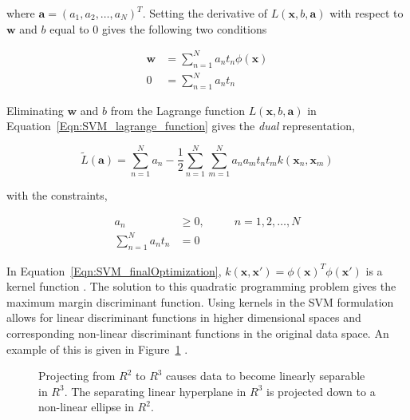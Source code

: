 where $\mathbf{a} = (a_1, a_2, \ldots, a_N)^T$.  Setting the derivative of $L(\mathbf{x}, b, \mathbf{a})$ with respect to $\mathbf{w}$ and $b$ equal to 0 gives the following two conditions

\begin{align}
\mathbf{w} &= \sum\limits_{n=1}^N a_n t_n \phi(\mathbf{x})\\
0 &=  \sum\limits_{n=1}^N a_n t_n
\end{align}

Eliminating $\mathbf{w}$ and $b$ from the Lagrange function $L(\mathbf{x}, b, \mathbf{a})$ in Equation~\ref{Eqn:SVM_lagrange_function} gives the \emph{dual} representation,

\begin{equation}
\tilde{L}(\mathbf{a}) = \sum\limits_{n=1}^N a_n - \frac{1}{2} \sum\limits_{n=1}^N \sum\limits_{m=1}^N a_n a_m t_n t_m k(\mathbf{x}_n, \mathbf{x}_m)
\label{Eqn:SVM_finalOptimization}
\end{equation}

with the constraints,

\begin{align}
a_n &\geq 0, \ \ \ \ \ \ \ \ \ \ \ \ n = 1, 2, \ldots, N \\
\sum\limits_{n=1}^N a_n t_n &= 0
\end{align}

In Equation~\ref{Eqn:SVM_finalOptimization}, $k(\mathbf{x}, \mathbf{x}') = \phi(\mathbf{x})^T\phi(\mathbf{x}')$ is a kernel function \cite{2007_BOOK_PRML_Bishop}.  The solution to this quadratic programming problem gives the maximum margin discriminant function.  Using kernels in the SVM formulation allows for linear discriminant functions in higher dimensional spaces and corresponding non-linear discriminant functions in the original data space.  An example of this is given in Figure~\ref{fig:SVM_kernel_example} \cite{2007_VID_kernel_Scholkpof}.

								\begin{figure}[t]
								\centering
								\caption{Projecting from $R^2$ to $R^3$ causes data to become linearly separable in $R^3$.  The separating linear hyperplane in $R^3$ is projected down to a non-linear ellipse in $R^2$.}
								\label{fig:SVM_kernel_example}
								\end{figure}






